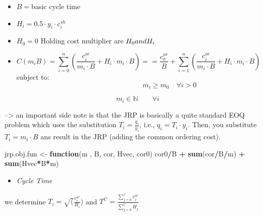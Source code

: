 \documentclass[
]{article}
\newenvironment{Shaded}{\begin{snugshade}}{\end{snugshade}}
\newcommand{\ControlFlowTok}[1]{\textcolor[rgb]{0.13,0.29,0.53}{\textbf{#1}}}
\newcommand{\KeywordTok}[1]{\textcolor[rgb]{0.13,0.29,0.53}{\textbf{#1}}}
\newcommand{\NormalTok}[1]{#1}
\newcommand{\OperatorTok}[1]{\textcolor[rgb]{0.81,0.36,0.00}{\textbf{#1}}}
\newcommand{\StringTok}[1]{\textcolor[rgb]{0.31,0.60,0.02}{#1}}
\providecommand{\tightlist}{%
  \setlength{\itemsep}{0pt}\setlength{\parskip}{0pt}}
\begin{document}
\begin{itemize}
\item
  \(B=\)basic cycle time
\item
  \(H_i=0.5 \cdot y_i \cdot c_i^{sh}\)
\item
  \(H_0=0\) Holding cost multiplier are \(H_0 \space and \space H_i\)
\item
  \[C(m_i B)=\sum_{i=0}^n (\frac {c_i^{or}}{m_i \cdot B}+H_i \cdot m_i \cdot B) == \frac {c_o^{or}}{B}+ \sum_{i=1}^n (\frac {c_i^{or}}{m_i \cdot B}+H_i \cdot m_i \cdot B)\]
  subject to: \[\quad \quad \quad \quad \quad \quad \quad \quad \quad
  m_i \ge m_0 \quad \forall i >0 \]

  \[m_i \in \mathbb N \qquad \forall i   \]
\end{itemize}

--\textgreater{} an important side note is that the JRP is basically a
quite standard EOQ problem which uses the substitution
\(T_i = \frac{q_i}{y_i}\), i.e., \(q_i = T_i \cdot y_i\). Then, you
substitute \(T_i = m_i \cdot B\) ans result in the JRP (adding the
common ordering cost).

\begin{Shaded}
\begin{Highlighting}[]
\NormalTok{jrp.obj.fun <-}\StringTok{ }\ControlFlowTok{function}\NormalTok{(m , B, cor, Hvec, cor0) cor0}\OperatorTok{/}\NormalTok{B }\OperatorTok{+}\StringTok{ }\KeywordTok{sum}\NormalTok{(cor}\OperatorTok{/}\NormalTok{B}\OperatorTok{/}\NormalTok{m) }\OperatorTok{+}\StringTok{ }\KeywordTok{sum}\NormalTok{(Hvec}\OperatorTok{*}\NormalTok{B}\OperatorTok{*}\NormalTok{m)}
\end{Highlighting}
\end{Shaded}

\begin{itemize}
\tightlist
\item
  \emph{Cycle Time}
\end{itemize}

we determine \(T_i=\sqrt (\frac {c_i^{or}}{H_i})\) and
\(T^C=\frac {\sum_{j=0}^{i´} c_j^{or}}{\sum_{j=0}^{i´}H_j}\)
\end{document}
